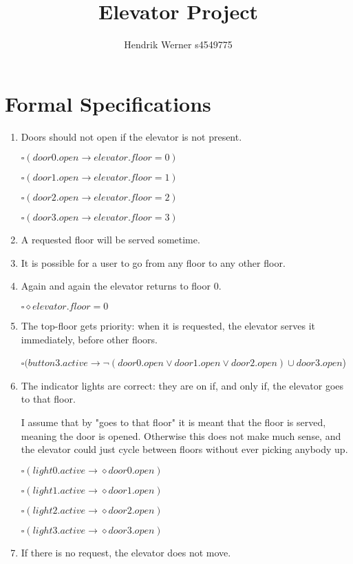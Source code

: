 \documentclass[12pt, a4paper]{article}
\title{Elevator Project}
\author{Hendrik Werner s4549775}
\begin{document}
\maketitle

\section{Formal Specifications}
\begin{enumerate}
	\item %
	Doors should not open if the elevator is not present.

	$\square (door0.open \rightarrow elevator.floor = 0)$

	$\square (door1.open \rightarrow elevator.floor = 1)$

	$\square (door2.open \rightarrow elevator.floor = 2)$

	$\square (door3.open \rightarrow elevator.floor = 3)$
	\item %
	A requested floor will be served sometime.
	\item %
	It is possible for a user to go from any floor to any other floor.
	\item %
	Again and again the elevator returns to floor 0.

	$\square \diamond elevator.floor = 0$
	\item %
	The top-floor gets priority: when it is requested, the elevator serves it immediately, before other floors.

	$\square (button3.active \rightarrow \lnot (door0.open \lor door1.open \lor door 2.open) \cup door3.open$)
	\item %
	The indicator lights are correct: they are on if, and only if, the elevator goes to that floor.

	I assume that by "goes to that floor" it is meant that the floor is served, meaning the door is opened. Otherwise this does not make much sense, and the elevator could just cycle between floors without ever picking anybody up.

	$\square (light0.active \rightarrow \diamond door0.open)$

	$\square (light1.active \rightarrow \diamond door1.open)$

	$\square (light2.active \rightarrow \diamond door2.open)$

	$\square (light3.active \rightarrow \diamond door3.open)$
	\item %
	If there is no request, the elevator does not move.
\end{enumerate}
\end{document}
